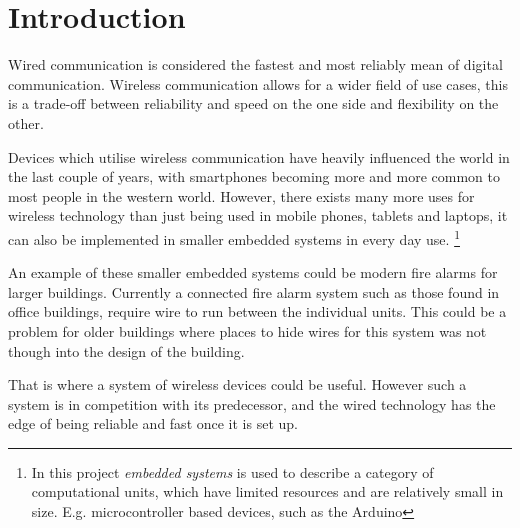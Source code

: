 \chapter{Introduction}
\vspace{-20pt}
Wired communication is considered the fastest and  most reliably mean of digital communication.
Wireless communication allows for a wider field of use cases, this is a trade-off between reliability and speed on the one side and flexibility on the other. \cite{wirelessTradeoffs}

Devices which utilise wireless communication have heavily influenced the world in the last couple of years, with smartphones becoming more and more common to most people in the western world. \cite{2013-SmartPhoneUse}
However, there exists many more uses for wireless technology than just being used in mobile phones, tablets and laptops, it can also be implemented in smaller embedded systems in every day use. 
\footnote{In this project \textit{embedded systems} is used to describe a category of computational units, which have limited resources and are relatively small in size. 
E.g. microcontroller based devices, such as the Arduino}



An example of these smaller embedded systems could be modern fire alarms for larger buildings.
Currently a connected fire alarm system such as those found in office buildings, require wire to run between the individual units.
This could be a problem for older buildings where places to hide wires for this system was not though into the design of the building.

That is where a system of wireless devices could be useful. 
However such a system is in competition with its predecessor, and the wired technology has the edge of being reliable and fast once it is set up. 


